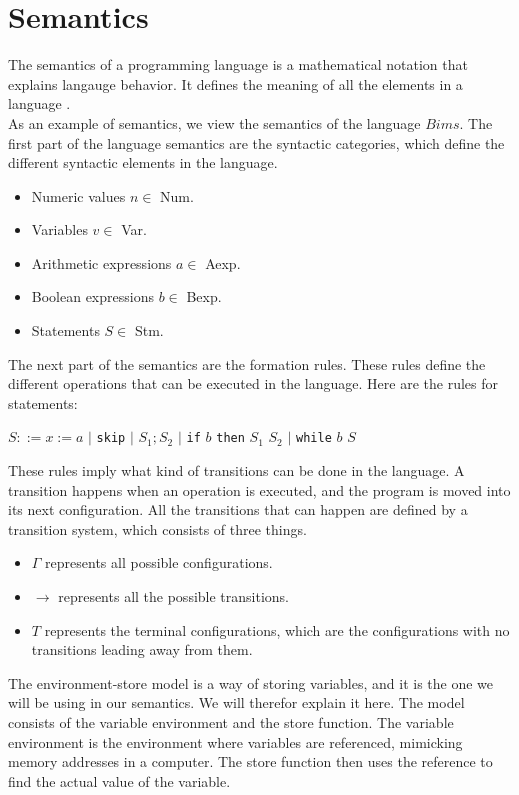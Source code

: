 \section{Semantics}
\label{sec:semantics}

The semantics of a programming language is a mathematical notation that explains langauge behavior. 
It defines the meaning of all the elements in a language \cite{misc:sem}.\\ \indent
As an example of semantics, we view the semantics of the language $Bims$. 
The first part of the language semantics are the syntactic categories, which define the different syntactic elements in the language.

\begin{itemize}
\item Numeric values $n \in$ Num.
\item Variables $v \in$ Var.
\item Arithmetic expressions $a \in$ Aexp.
\item Boolean expressions $b \in$ Bexp.
\item Statements $S \in$ Stm.
\end{itemize}

The next part of the semantics are the formation rules. 
These rules define the different operations that can be executed in the language. 
Here are the rules for statements: \newline

$S ::= x := a$ $|$ \texttt{skip} $|$ $S_1;S_2$ $|$ \texttt{if} $b$ \texttt{then} $S_1$  $S_2$ $|$ \texttt{while} $b$  $S$\newline

These rules imply what kind of transitions can be done in the language. 
A transition happens when an operation is executed, and the program is moved into its next configuration. 
All the transitions that can happen are defined by a transition system, which consists of three things. 

\begin{itemize}
\item $\Gamma$ represents all possible configurations. 
\item $\rightarrow$ represents all the possible transitions.
\item $T$ represents the terminal configurations, which are the configurations with no transitions leading away from them.
\end{itemize}

The environment-store model is a way of storing variables, and it is the one we will be using in our semantics. 
We will therefor explain it here. \newline
The model consists of the variable environment and the store function. 
The variable environment is the environment where variables are referenced, mimicking memory addresses in a computer. 
The store function then uses the reference to find the actual value of the variable. \newline

